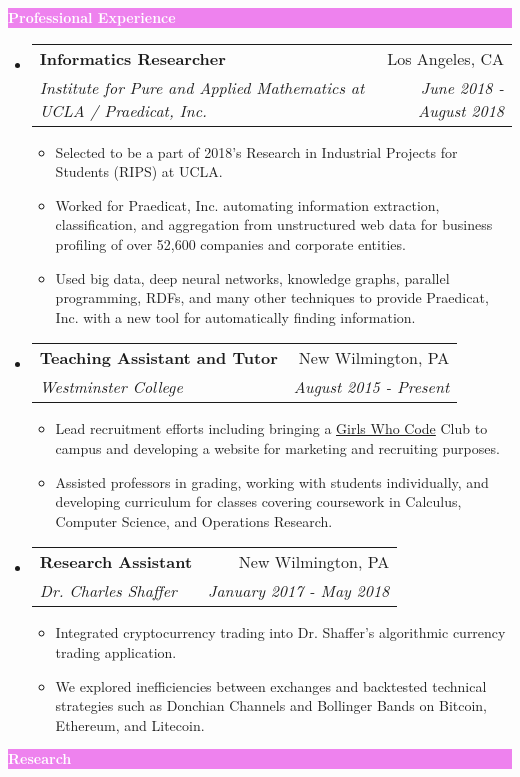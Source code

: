 \documentclass[letterpaper,11pt]{article}
\makeatletter
\newcommand{\resitem}[1]{\item #1 \vspace{-2pt}}
\newcommand{\resheading}[1]{{\large \colorbox{violet}{\begin{minipage}{\textwidth}{\textbf{#1 \vphantom{p\^{E}}}}\end{minipage}}}}
\newcommand{\ressubheading}[4]{
	\begin{tabular*}{7.0in}{l@{\extracolsep{\fill}}r}
		\textbf{#1} & #2 \\
		\textit{#3} & \textit{#4} \\
	\end{tabular*}\vspace{-6pt}}
\makeatother
\begin{document}
	\resheading{\textcolor{white}{Professional Experience}}
	\begin{itemize}[topsep=3pt, itemsep=1pt]
		\item
		\ressubheading{Informatics Researcher}{Los Angeles, CA}{Institute for Pure and Applied Mathematics at UCLA / Praedicat, Inc.}{June 2018 -August 2018}
		\begin{itemize}[topsep=3pt, itemsep=1pt]
			\resitem{Selected to be a part of 2018’s Research in Industrial Projects for Students (RIPS) at UCLA.}
			\resitem{Worked for Praedicat, Inc. automating information extraction, classification, and aggregation from unstructured web data for business profiling of over 52,600 companies and corporate entities.}
			\resitem{Used big data, deep neural networks, knowledge graphs, parallel programming, RDFs, and many other techniques to provide Praedicat, Inc. with a new tool for automatically finding information.}
		\end{itemize}
		\item
		\ressubheading{Teaching Assistant and Tutor}{New Wilmington, PA}{Westminster College}{August 2015 - Present}
		\begin{itemize}[topsep=3pt, itemsep=1pt]
			\resitem{Lead recruitment efforts including bringing a \href{https://girlswhocode.com}{Girls Who Code} Club to campus and  developing a website for marketing and recruiting purposes.}
			\resitem{Assisted professors in grading, working with students individually, and developing curriculum for classes covering coursework in Calculus, Computer Science, and Operations Research.}
		\end{itemize}
	
		\item
		\ressubheading{Research Assistant}{New Wilmington, PA}{Dr. Charles Shaffer}{January 2017 - May 2018}
		\begin{itemize}[topsep=3pt, itemsep=1pt]
			\resitem{Integrated cryptocurrency trading into Dr. Shaffer's algorithmic currency trading application.}
			\resitem{We explored inefficiencies between exchanges and backtested technical strategies such as Donchian Channels and Bollinger Bands on Bitcoin, Ethereum, and Litecoin.}
		\end{itemize}
		
	\end{itemize}
	
	\resheading{\textcolor{white}{Research}}
	
		\vspace{0.1in}
		
\end{document}
